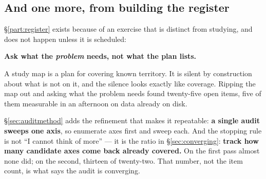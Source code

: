 \subsection*{And one more, from building the register}
\label{sec:habit-register}

\S\ref{part:register} exists because of an exercise that is distinct from
studying, and does not happen unless it is scheduled:

\begin{invariant}
\textbf{Ask what the \emph{problem} needs, not what the plan lists.}
\end{invariant}

A study map is a plan for covering known territory. It is silent by construction
about what is not on it, and the silence looks exactly like coverage. Ripping
the map out and asking what the problem needs found twenty-five open items, five
of them measurable in an afternoon on data already on disk.

\S\ref{sec:auditmethod} adds the refinement that makes it repeatable: \textbf{a
single audit sweeps one axis}, so enumerate axes first and sweep each. And the
stopping rule is not ``I cannot think of more'' --- it is the ratio in
\S\ref{sec:converging}: \textbf{track how many candidate axes come back already
covered.} On the first pass almost none did; on the second, thirteen of
twenty-two. That number, not the item count, is what says the audit is
converging.
